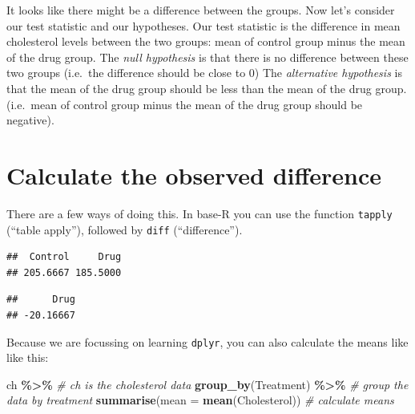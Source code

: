 \documentclass[
  a4paperpaper,
]{book}
\newenvironment{Shaded}{\begin{snugshade}}{\end{snugshade}}
\newcommand{\CommentTok}[1]{\textcolor[rgb]{0.56,0.35,0.01}{\textit{#1}}}
\newcommand{\DataTypeTok}[1]{\textcolor[rgb]{0.13,0.29,0.53}{#1}}
\newcommand{\KeywordTok}[1]{\textcolor[rgb]{0.13,0.29,0.53}{\textbf{#1}}}
\newcommand{\NormalTok}[1]{#1}
\newcommand{\OperatorTok}[1]{\textcolor[rgb]{0.81,0.36,0.00}{\textbf{#1}}}
\newcommand{\StringTok}[1]{\textcolor[rgb]{0.31,0.60,0.02}{#1}}
\begin{document}
It looks like there might be a difference between the groups.
Now let's consider our test statistic and our hypotheses. Our test statistic is the difference in mean cholesterol levels between the two groups: mean of control group minus the mean of the drug group.
The \emph{null hypothesis} is that there is no difference between these two groups (i.e.~the difference should be close to 0)
The \emph{alternative hypothesis} is that the mean of the drug group should be less than the mean of the drug group. (i.e.~mean of control group minus the mean of the drug group should be negative).

\hypertarget{calculate-the-observed-difference}{%
\section{Calculate the observed difference}\label{calculate-the-observed-difference}}

There are a few ways of doing this. In base-R you can use the function \texttt{tapply} (``table apply''), followed by \texttt{diff} (``difference'').

\begin{Shaded}
\end{Shaded}

\begin{verbatim}
##  Control     Drug 
## 205.6667 185.5000
\end{verbatim}

\begin{Shaded}
\end{Shaded}

\begin{verbatim}
##      Drug 
## -20.16667
\end{verbatim}

Because we are focussing on learning \texttt{dplyr}, you can also calculate the means like like this:

\begin{Shaded}
\begin{Highlighting}[]
\NormalTok{ch }\OperatorTok{\%\textgreater{}\%}\StringTok{ }\CommentTok{\# ch is the cholesterol data}
\StringTok{  }\KeywordTok{group\_by}\NormalTok{(Treatment) }\OperatorTok{\%\textgreater{}\%}\StringTok{ }\CommentTok{\# group the data by treatment}
\StringTok{  }\KeywordTok{summarise}\NormalTok{(}\DataTypeTok{mean =} \KeywordTok{mean}\NormalTok{(Cholesterol)) }\CommentTok{\# calculate means}
\end{Highlighting}
\end{Shaded}
\end{document}
